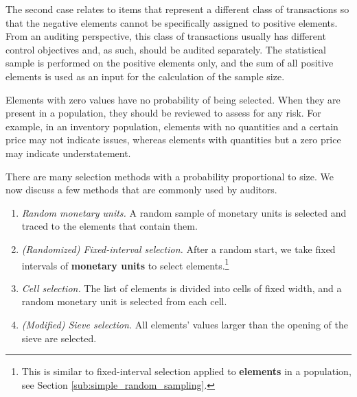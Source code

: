 \documentclass[12pt,a4paper]{memoir}
\begin{document}
The second case relates to items that represent a different class of transactions so that the negative elements cannot be specifically assigned to positive elements. From an auditing perspective, this class of transactions usually has different control objectives and, as such, should be audited separately. The statistical sample is performed on the positive elements only, and the sum of all positive elements is used as an input for the calculation of the sample size.

Elements with zero values have no probability of being selected. When they are present in a population, they should be reviewed to assess for any risk. For example, in an inventory population, elements with no quantities and a certain price may not indicate issues, whereas elements with quantities but a zero price may indicate  understatement.

\bigskip
There are many selection methods with a probability proportional to size. We now discuss a few methods that are commonly used by auditors. 
\begin{enumerate}
\item \textit{Random monetary units.} A random sample of monetary units is selected and traced to the elements that contain them.
\item \textit{(Randomized) Fixed-interval selection.} After a random start, we take fixed intervals of \textbf{monetary units} to select elements.\footnote{This is similar to fixed-interval selection applied to \textbf{elements} in a population, see Section \ref{sub:simple_random_sampling}.}
\item \textit{Cell selection.} The list of elements is divided into cells of fixed width, and a random monetary unit is selected from each cell.
\item \textit{(Modified) Sieve selection.} All elements' values larger than the opening of the sieve are selected.
\end{enumerate}
\end{document}
